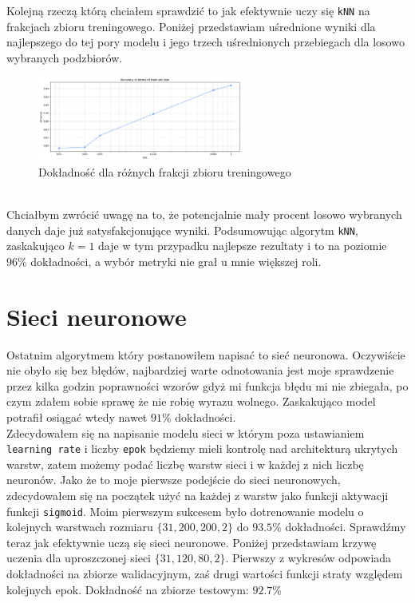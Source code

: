 \documentclass[polish,12pt,a4paper]{extarticle}
\begin{document}
Kolejną rzeczą którą chciałem sprawdzić to jak efektywnie uczy się \texttt{kNN} na frakcjach zbioru treningowego. Poniżej przedstawiam uśrednione wyniki dla najlepszego do tej pory modelu i jego trzech uśrednionych przebiegach dla losowo wybranych podzbiorów.
\begin{figure}[h!]
    \centering
    \includegraphics[width=0.60\textwidth]{img/accuracy_size.png}
    \caption{Dokładność dla różnych frakcji zbioru treningowego}
\end{figure} \FloatBarrier \\
Chciałbym zwrócić uwagę na to, że potencjalnie mały procent losowo wybranych danych daje już satysfakcjonujące wyniki. Podsumowując algorytm \texttt{kNN}, zaskakująco $k = 1$ daje w tym przypadku najlepsze rezultaty i to na poziomie $96\%$ dokładności, a wybór metryki nie grał u mnie większej roli.

\section*{Sieci neuronowe}
Ostatnim algorytmem który postanowiłem napisać to sieć neuronowa. Oczywiście nie obyło się bez błędów, najbardziej warte odnotowania jest moje sprawdzenie przez kilka godzin poprawności wzorów gdyż mi funkcja błędu mi nie zbiegała, po czym zdałem sobie sprawę że nie robię wyrazu wolnego. Zaskakująco model potrafił osiągać wtedy nawet $91\%$ dokładności. \smallskip \\
Zdecydowałem się na napisanie modelu sieci w którym poza ustawianiem \texttt{learning rate} i liczby \texttt{epok} będziemy mieli kontrolę nad architekturą ukrytych warstw, zatem możemy podać liczbę warstw sieci i w każdej z nich liczbę neuronów. Jako że to moje pierwsze podejście do sieci neuronowych, zdecydowałem się na początek użyć na każdej z warstw jako funkcji aktywacji funkcji \texttt{sigmoid}.
Moim pierwszym sukcesem było dotrenowanie modelu o kolejnych warstwach rozmiaru $\{31, 200, 200, 2\}$ do $93.5\%$ dokładności. Sprawdźmy teraz jak efektywnie uczą się sieci neuronowe. Poniżej przedstawiam krzywę uczenia dla uproszczonej sieci $\{31, 120, 80, 2\}$. Pierwszy z wykresów odpowiada dokładności na zbiorze walidacyjnym, zaś drugi wartości funkcji straty względem kolejnych epok. Dokładność na zbiorze testowym: $92.7\%$
\end{document}
